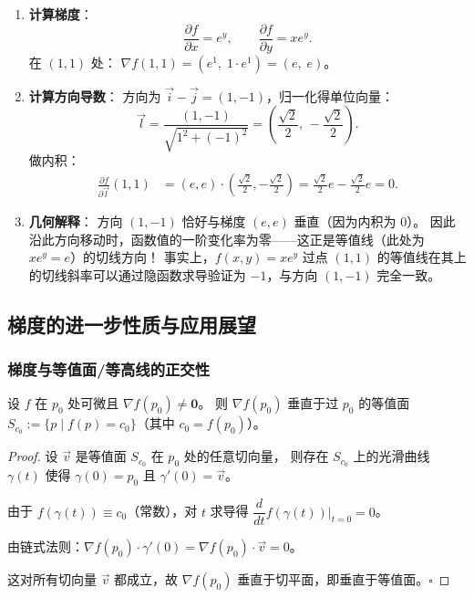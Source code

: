 \documentclass[lang=cn,11pt]{elegantbook}
\begin{document}
\begin{solution}
\begin{enumerate}
  \item \textbf{计算梯度}：
  \[
  \frac{\partial f}{\partial x}=e^y,\qquad
  \frac{\partial f}{\partial y}=xe^y.
  \]
  在 $(1,1)$ 处：
  $\nabla f(1,1)=(e^1,\;1\cdot e^1)=(e,\;e)$。

  \item \textbf{计算方向导数}：
  方向为 $\vec i-\vec j=(1,-1)$，归一化得单位向量：
  \[
  \vec l=\frac{(1,-1)}{\sqrt{1^2+(-1)^2}} =\left(\frac{\sqrt2}{2},\,-\frac{\sqrt2}{2}\right).
  \]
  做内积：
  \begin{align*}
  \frac{\partial f}{\partial\vec l}(1,1) &= (e,e)\cdot\left(\frac{\sqrt2}{2},-\frac{\sqrt2}{2}\right)= \frac{\sqrt2}{2}e-\frac{\sqrt2}{2}e = \boxed{0}.
  \end{align*}

  \item \textbf{几何解释}：
  方向 $(1,-1)$ 恰好与梯度 $(e,e)$ 垂直（因为内积为 0）。
  因此沿此方向移动时，函数值的一阶变化率为零——这正是等值线（此处为 $xe^y=e$）的切线方向！
  事实上，$f(x,y)=xe^y$ 过点 $(1,1)$ 的等值线在其上的切线斜率可以通过隐函数求导验证为 $-1$，与方向 $(1,-1)$ 完全一致。
\end{enumerate}
\end{solution}


\subsection{梯度的进一步性质与应用展望}

\subsubsection*{梯度与等值面/等高线的正交性}

\begin{proposition}[梯度垂直于等值面] \label{prop:gradient-perpendicular}
设 $f$ 在 $p_0$ 处可微且 $\nabla f(p_0)\neq\boldsymbol 0$。
则 $\nabla f(p_0)$ 垂直于过 $p_0$ 的等值面
$S_{c_0}:=\{p\mid f(p)=c_0\}$（其中 $c_0=f(p_0)$）。
\end{proposition}

\begin{proof}
设 $\vec v$ 是等值面 $S_{c_0}$ 在 $p_0$ 处的任意切向量，
则存在 $S_{c_0}$ 上的光滑曲线 $\gamma(t)$ 使得
$\gamma(0)=p_0$ 且 $\gamma'(0)=\vec v$。

由于 $f(\gamma(t))\equiv c_0$（常数），对 $t$ 求导得
$\dfrac{d}{dt}f(\gamma(t))\biggr|_{t=0}=0$。

由链式法则：$\nabla f(p_0)\cdot\gamma'(0)=\nabla f(p_0)\cdot\vec v=0$。

这对所有切向量 $\vec v$ 都成立，故 $\nabla f(p_0)$ 垂直于切平面，即垂直于等值面。\hfill$\square$
\end{proof}
\end{document}
